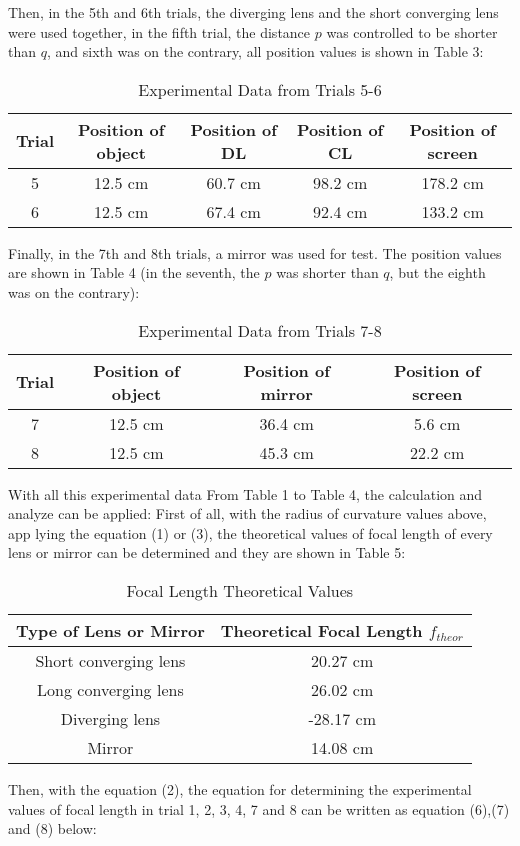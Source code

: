 \documentclass[12pt]{article}
\begin{document}
Then, in the 5th and 6th trials, the diverging lens and the short converging lens were used together, in the fifth trial, the distance $p$ was controlled to be shorter than $q$, and sixth was on the contrary, all position values is shown in Table 3:
\begin{table}[H]
\caption{Experimental Data from Trials 5-6}
\centering
\begin{tabular}[width=05\linewidth]{ccccc}
     
Trial &Position of object &Position of DL &Position of CL &Position of screen\\
\hline
5 &12.5 cm &60.7 cm &98.2 cm &178.2 cm\\
6 &12.5 cm &67.4 cm &92.4 cm &133.2 cm\\
      \hline
      \end{tabular}
\end{table}

Finally, in the 7th and 8th trials, a mirror was used for test. The position values are shown in Table 4 (in the seventh, the $p$ was shorter than $q$, but the eighth was on the contrary):
\begin{table}[H]
\caption{Experimental Data from Trials 7-8}
\centering
\begin{tabular}[width=05\linewidth]{cccc}
     
Trial &Position of object &Position of mirror &Position of screen\\
\hline
7 &12.5 cm &36.4 cm &5.6 cm\\
8 &12.5 cm &45.3 cm &22.2 cm \\



      \hline
      \end{tabular}
\end{table}
With all this experimental data From Table 1 to Table 4, the calculation and analyze can be applied: First of all, with the radius of curvature values above, app lying the equation (1) or (3), the theoretical values of focal length of every lens or mirror can be determined and they are shown in Table 5:
\begin{table}[H]
\caption{Focal Length Theoretical Values}
\centering
\begin{tabular}[width=05\linewidth]{cc}
     
Type of Lens or Mirror     &Theoretical Focal Length ${f}_{theor}$\\
\hline
Short converging lens &20.27 cm\\
Long converging lens &26.02 cm\\
Diverging lens &-28.17 cm\\
Mirror &14.08 cm\\
      \hline
      \end{tabular}
\end{table}
Then, with the equation (2), the equation for determining the experimental values of focal length in trial 1, 2, 3, 4, 7 and 8 can be written as equation (6),(7) and (8) below:
\end{document}
